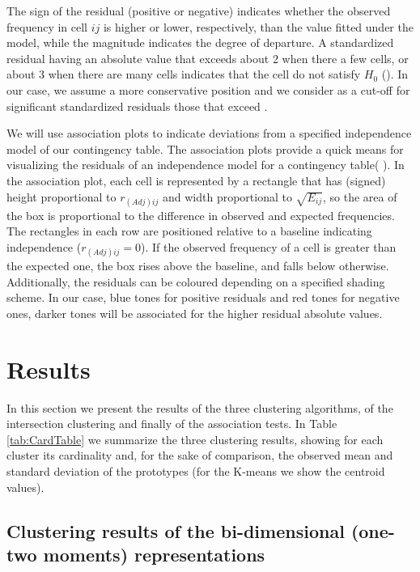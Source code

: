 \documentclass{bmcart}
\begin{document}
The sign of the residual (positive or negative) indicates whether the observed frequency in cell $ij$ is higher or lower, respectively, than the value  fitted under the model, while the magnitude indicates the degree of departure. A standardized residual having an absolute value that exceeds about 2 when there a few cells, or about 3 when there are many cells indicates that the cell do not satisfy $H_0$ (\cite{Agresti2018introduction}). In our case, we assume a more conservative position and we consider as a cut-off for significant standardized residuals those that exceed  .

We will use association plots to indicate deviations from a specified independence model of our contingency table. The association plots provide a quick means for visualizing the residuals of an independence model for a contingency table( \cite{vcd_assoc1,vcd_assoc2,vcd_assoc3}). In the association plot, each cell is represented by a rectangle that has (signed) height proportional to $r_{(Adj)ij}$ and width proportional to $\sqrt{E_{ij}}$, so the area of the box is proportional to the difference in observed and expected frequencies. The rectangles in each row are positioned relative to a baseline indicating independence ($r_{(Adj)ij} = 0$). If the observed frequency of a cell is greater than the expected one, the box rises above the baseline, and falls below otherwise. Additionally, the residuals can be coloured depending on a specified shading scheme. In our case, blue tones for positive residuals and red tones for negative ones, darker tones will be associated for the higher residual absolute values.


\section*{Results}

In this section we present the results of the three clustering algorithms, of the intersection clustering and finally of the association tests. In Table  \ref{tab:CardTable} we summarize the three clustering results, showing for each cluster its cardinality and, for the sake of comparison, the observed mean and standard deviation of the prototypes (for the K-means we show the centroid values).\\



\subsection*{Clustering results of the bi-dimensional (one-two moments) representations}
\end{document}
